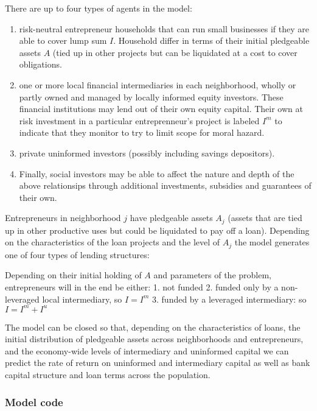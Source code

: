 \documentclass[11pt]{article}
\providecommand{\tightlist}{%
      \setlength{\itemsep}{0pt}\setlength{\parskip}{0pt}}
\begin{document}
    There are up to four types of agents in the model:

\begin{enumerate}
\def\labelenumi{\arabic{enumi}.}
\tightlist
\item
  risk-neutral entrepreneur households that can run small businesses if
  they are able to cover lump sum \(I\). Household differ in terms of
  their initial pledgeable assets \(A\) (tied up in other projects but
  can be liquidated at a cost to cover obligations.
\item
  one or more local financial intermediaries in each neighborhood,
  wholly or partly owned and managed by locally informed equity
  investors. These financial institutions may lend out of their own
  equity capital. Their own at risk investment in a particular
  entreprenneur's project is labeled \(I^m\) to indicate that they
  monitor to try to limit scope for moral hazard.
\item
  private uninformed investors (possibly including savings depositors).
\item
  Finally, social investors may be able to affect the nature and depth
  of the above relationsips through additional investments, subsidies
  and guarantees of their own.
\end{enumerate}

Entrepreneurs in neighborhood \(j\) have pledgeable assets \(A_j\)
(assets that are tied up in other productive uses but could be
liquidated to pay off a loan). Depending on the characteristics of the
loan projects and the level of \(A_j\) the model generates one of four
types of lending structures:

Depending on their initial holding of \(A\) and parameters of the
problem, entrepreneurs will in the end be either: 1. not funded 2.
funded only by a non-leveraged local intermediary, so \(I = I^m\) 3.
funded by a leveraged intermediary: so \(I = I^m + I^u\)

The model can be closed so that, depending on the characteristics of
loans, the initial distribution of pledgeable assets across
neighborhoods and entrepreneurs, and the economy-wide levels of
intermediary and uninformed capital we can predict the rate of return on
uninformed and intermediary capital as well as bank capital structure
and loan terms across the population.

    \subsubsection{Model code}\label{model-code}
\end{document}

